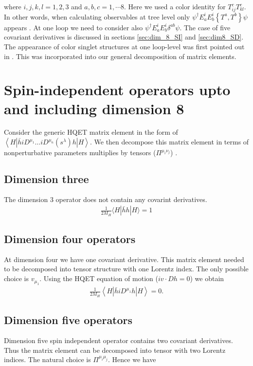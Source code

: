 where $i,j,k,l=1,2,3$ and $a,b,c=1,\cdots 8$. Here  we used a color identity for $T^c_{ij}T^c_{kl}$. In other words, when calculating observables at tree level only $\psi^\dagger E^i_a E^i_b\left\{T^a,T^b\right\} \psi$ appears \cite{Manohar:1997qy}. At one loop we need to consider also $\psi^\dagger E^i_a E^i_b \delta^{ab}\psi$. The case of five covariant derivatives is discussed in sections \ref{sec:dim_8_SI} and \ref{sec:dim8_SD}. The appearance of color singlet structures at one loop-level was first pointed out in \cite{Kobach:2017xkw}. This was incorporated into our general decomposition of matrix elements. 

\section{Spin-independent operators upto and including dimension 8}\label{sec:SI_mat_decomp}

Consider the generic HQET matrix element in the form of $\left\langle H\left|\bar{h} i D^{\mu_{1}} \ldots i D^{\mu_{n}}\left(s^{\lambda}\right) h\right| H\right\rangle$. We then decompose this matrix element in terms of nonperturbative parameters multiplies by tensors ($\Pi^{\mu_i\nu_j}$) \cite{Gunawardana:2017zix}. 
\subsection{Dimension three}
The dimension 3 operator does not contain any covarint derivatives.
\begin{eqnarray}\label{eqn:chap4_dim_3_SI_decomp}
\frac{1}{2 M_{H}}\langle H|\bar{h} h| H\rangle= 1
\end{eqnarray}
\subsection{Dimension four operators}
At dimension four we have one covariant derivative. This matrix element needed to be decomposed into tensor structure with one Lorentz index. The only possible choice is $v_{\mu_1}$. Using the HQET equation of motion ($iv\cdot Dh=0$) we obtain 
\begin{eqnarray}\label{eqn:chap4_dim4_SI_decomp}
\frac{1}{2 M_{H}}\left\langle H\left|\bar{h} i D^{\mu_{1}} h\right| H\right\rangle = 0.
\end{eqnarray}
\subsection{Dimension five operators}
Dimension five spin independent operator contains two covariant derivatives. Thus the matrix element can be decomposed into tensor with two Lorentz indices. The natural choice is $\Pi^{\mu_i\mu_j}$. Hence we have 


